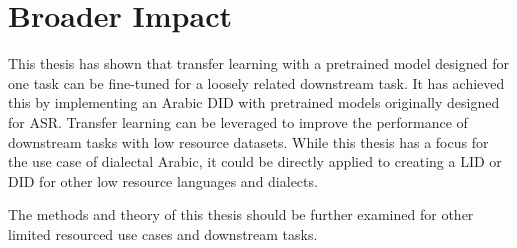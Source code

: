 \section{Broader Impact}\label{sect:impact}

This thesis has shown that transfer learning with a pretrained model designed for one task can be fine-tuned for a loosely related downstream task. It has achieved this by 
implementing an Arabic DID with pretrained models originally designed for ASR. 
Transfer learning can be leveraged to improve the performance of downstream tasks with low resource datasets.
While this thesis has a focus for the use case of dialectal Arabic, it could be directly applied to creating a LID or DID for other low resource languages and dialects. 

The methods and theory of this thesis should be further examined for other limited resourced use cases and downstream tasks. 


